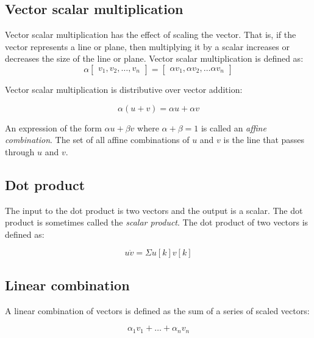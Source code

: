 \documentclass[11pt, oneside]{article}   	%
\begin{document}
\subsection{Vector scalar multiplication}

Vector scalar multiplication has the effect of scaling the vector. That is, if the vector represents a line or plane, then multiplying it by a scalar increases or decreases the size of the line or plane. Vector scalar multiplication is defined as:
 \begin{displaymath}
\alpha \begin{bmatrix} v_1, v_2, \dots, v_n \end{bmatrix} = \begin{bmatrix} \alpha v_1, \alpha v_2, \dots \alpha v_n \end{bmatrix}
\end{displaymath}

Vector scalar multiplication is distributive over vector addition:

\begin{displaymath}
\alpha(u + v) = \alpha u + \alpha v
\end{displaymath}

An expression of the form $\alpha u + \beta v$ where $\alpha + \beta = 1$ is called an \textit{affine combination}. The set of all affine combinations of $u$ and $v$ is the line that passes through $u$ and $v$.

\subsection{Dot product}

The input to the dot product is two vectors and the output is a scalar. The dot product is sometimes called the \textit{scalar product}. The dot product of two vectors is defined as:

\begin{displaymath}
u \dot v = \Sigma u[k] v[k]
\end{displaymath}

\subsection{Linear combination}

A linear combination of vectors is defined as the sum of a series of scaled vectors:

\begin{displaymath}
\alpha_1 v_1 + \dots + \alpha_n v_n
\end{displaymath}
\end{document}
